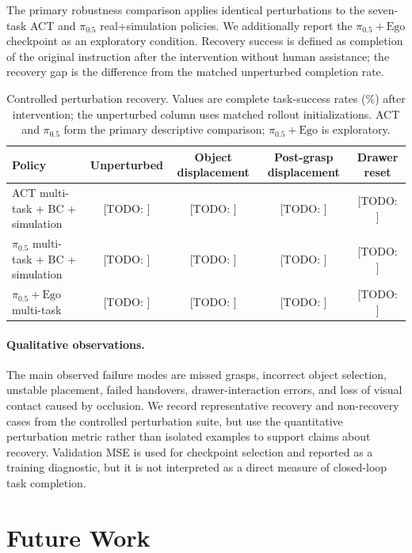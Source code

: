 \documentclass[10pt,conference]{IEEEtran}
\newcommand{\TODO}[1]{\textcolor{red!70!black}{[TODO: #1]}}
\begin{document}
The primary robustness comparison applies identical perturbations to the
seven-task ACT and $\pi_{0.5}$ real+simulation policies. We additionally report
the $\pi_{0.5}+\mathrm{Ego}$ checkpoint as an exploratory condition. Recovery
success is defined as completion of the original instruction after the
intervention without human assistance; the recovery gap is the difference from
the matched unperturbed completion rate.

\begin{table}[t]
\centering
\small
\caption{Controlled perturbation recovery. Values are complete task-success
rates (\%) after intervention; the unperturbed column uses matched rollout
initializations. ACT and $\pi_{0.5}$ form the primary descriptive comparison;
$\pi_{0.5}+\mathrm{Ego}$ is exploratory.}
\label{tab:perturbation}
\begin{tabular}{@{}lcccc@{}}
\toprule
Policy & Unperturbed & Object displacement &
Post-grasp displacement & Drawer reset \\
\midrule
ACT multi-task + BC + simulation
& \TODO{} & \TODO{} & \TODO{} & \TODO{} \\
$\pi_{0.5}$ multi-task + BC + simulation
& \TODO{} & \TODO{} & \TODO{} & \TODO{} \\
$\pi_{0.5}+\mathrm{Ego}$ multi-task
& \TODO{} & \TODO{} & \TODO{} & \TODO{} \\
\bottomrule
\end{tabular}
\end{table}

\paragraph{Qualitative observations.}
The main observed failure modes are missed grasps, incorrect object selection,
unstable placement, failed handovers, drawer-interaction errors, and loss of
visual contact caused by occlusion. We record representative recovery and
non-recovery cases from the controlled perturbation suite, but use the
quantitative perturbation metric rather than isolated examples to support
claims about recovery. Validation MSE is used for checkpoint selection and
reported as a training diagnostic, but it is not interpreted as a direct
measure of closed-loop task completion.

\section{Future Work}
\label{sec:future_work}
\end{document}
